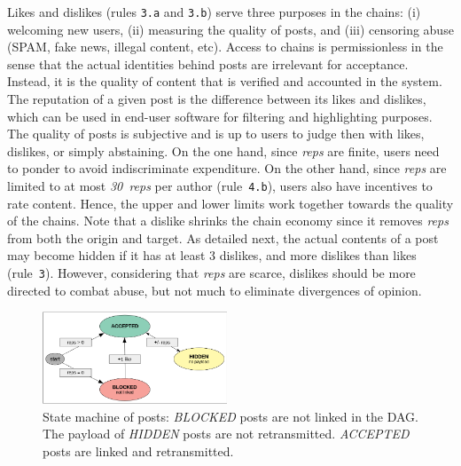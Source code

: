 \documentclass[10pt,journal,compsoc]{IEEEtran}
\newcommand{\reps}     {\emph{reps}\xspace}
\newcommand{\nreps}[1] {\emph{#1~reps\xspace}}
\begin{document}
Likes and dislikes (rules \texttt{3.a} and \texttt{3.b}) serve three purposes
in the chains:
    (i) welcoming new users,
    (ii) measuring the quality of posts, and
    (iii) censoring abuse (SPAM, fake news, illegal content, etc).
%
Access to chains is permissionless in the sense that the actual identities
behind posts are irrelevant for acceptance.
Instead, it is the quality of content that is verified and accounted in the
system.
%
The reputation of a given post is the difference between its likes and
dislikes, which can be used in end-user software for filtering and highlighting
purposes.
%
The quality of posts is subjective and is up to users to judge then with likes,
dislikes, or simply abstaining.
%
On the one hand, since \reps are finite, users need to ponder to avoid
indiscriminate expenditure.
On the other hand, since \reps are limited to at most \nreps{30} per author
(rule~\texttt{4.b}), users also have incentives to rate content.
Hence, the upper and lower limits work together towards the quality of the
chains.
%
Note that a dislike shrinks the chain economy since it removes \reps from both
the origin and target.
As detailed next, the actual contents of a post may become hidden if it has at
least 3 dislikes, and more dislikes than likes (rule~\texttt{3}).
However, considering that \reps are scarce, dislikes should be more directed to
combat abuse, but not much to eliminate divergences of opinion.

\begin{figure}
\centering
\includegraphics[width=0.49\textwidth]{state.png}
\caption{
    State machine of posts:
    \emph{BLOCKED} posts are not linked in the DAG.
    The payload of \emph{HIDDEN} posts are not retransmitted.
    \emph{ACCEPTED} posts are linked and retransmitted.
}
\label{fig.state}
\end{figure}
\end{document}
